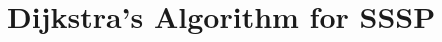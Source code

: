 \section{Dijkstra's Algorithm for SSSP}

\begin{frame}{}
\end{frame}
\begin{frame}{}
\end{frame}
\begin{frame}{}
\end{frame}
\begin{frame}{}
\end{frame}
\begin{frame}{}
\end{frame}
\begin{frame}{}
\end{frame}
\begin{frame}{}
\end{frame}
\begin{frame}{}
\end{frame}
\begin{frame}{}
\end{frame}
\begin{frame}{}
\end{frame}
\begin{frame}{}
\end{frame}
